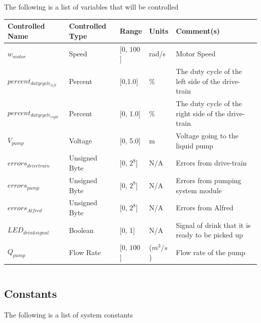 \documentclass [10pt]{article}
\begin{document}
The following is a list of variables that will be controlled

\begin{longtable}{|l|l|l|l|l|}\hline 
	\rowcolor{tableCell}Controlled Name & Controlled Type & Range & Units & Comment(s) \\ \hline
    $w_{motor}$ & Speed & [0, $ 100 $]& rad/s &  Motor Speed\\ \hline
    	$ percent_{dutycycle_{left}} $ & Percent & [0,1.0] & \% & The duty cycle of the left side of the drive-train \\ \hline
    $ percent_{dutycycle_{right}} $ & Percent & [0, 1.0]& \% & The duty cycle of the right side of the drive-train\\ \hline
    $  V_{pump} $ & Voltage & [0, 5.0]& m &  Voltage going to the liquid pump \\ \hline
	$ errors_{drivetrain} $ & Unsigned Byte & [0, $2^{8}$]& N/A & Errors from drive-train \\ \hline
	$  errors_{pump} $ & Unsigned Byte & [0, $2^{8}$]& N/A & Errors from pumping system module \\ \hline
	$  errors_{Alfred} $ & Unsigned Byte & [0, $2^{8}$]& N/A & Errors from Alfred \\ \hline
	$LED_{drinksignal}$ & Boolean & [0, 1]& N/A & Signal of drink that it is ready to be picked up \\ \hline
	$Q_{pump}$ & Flow Rate & [0, $ 100 $]& ($m^3/s$) &  Flow rate of the pump\\ \hline
\end{longtable}



\begin{longtable}{|l|l|l|l|l|}\hline 


\end{longtable}

\subsection{Constants}

The following is a list of system constants
\end{document}
